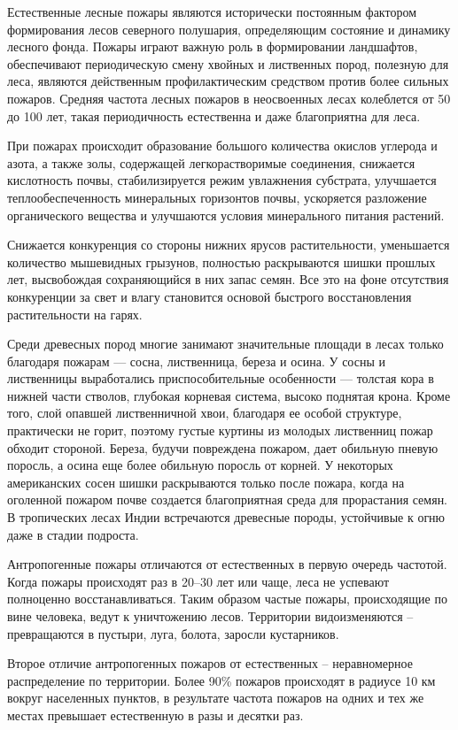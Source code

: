     Естественные лесные пожары являются исторически постоянным фактором формирования лесов северного полушария, определяющим состояние и динамику лесного фонда. Пожары играют важную роль в формировании ландшафтов, обеспечивают периодическую смену хвойных и лиственных пород, полезную для леса, являются действенным профилактическим средством против более сильных пожаров. Средняя частота лесных пожаров в неосвоенных лесах колеблется от 50 до 100 лет, такая периодичность естественна и даже благоприятна для леса.
    
    При пожарах происходит образование большого количества окислов углерода и азота, а также золы, содержащей легкорастворимые соединения, снижается кислотность почвы, стабилизируется режим увлажнения субстрата, улучшается теплообеспеченность минеральных горизонтов почвы, ускоряется разложение органического вещества и улучшаются условия минерального питания растений.
    
    Снижается конкуренция со стороны нижних ярусов растительности, уменьшается количество мышевидных грызунов, полностью раскрываются шишки прошлых лет, высвобождая сохраняющийся в них запас семян. Все это на фоне отсутствия конкуренции за свет и влагу становится основой быстрого восстановления растительности на гарях.
    
    Среди древесных пород многие занимают значительные площади в лесах только благодаря пожарам — сосна, лиственница, береза и осина. У сосны и лиственницы выработались приспособительные особенности — толстая кора в нижней части стволов, глубокая корневая система, высоко поднятая крона. Кроме того, слой опавшей лиственничной хвои, благодаря ее особой структуре, практически не горит, поэтому густые куртины из молодых лиственниц пожар обходит стороной. Береза, будучи повреждена пожаром, дает обильную пневую поросль, а осина еще более обильную поросль от корней. У некоторых американских сосен шишки раскрываются только после пожара, когда на оголенной пожаром почве создается благоприятная среда для прорастания семян. В тропических лесах Индии встречаются древесные породы, устойчивые к огню даже в стадии подроста.

    Антропогенные пожары отличаются от естественных в первую очередь частотой. Когда пожары происходят раз в 20–30 лет или чаще, леса не успевают полноценно восстанавливаться. Таким образом частые пожары, происходящие по вине человека, ведут к уничтожению лесов. Территории видоизменяются – превращаются в пустыри, луга, болота, заросли кустарников. 

    Второе отличие антропогенных пожаров от естественных – неравномерное распределение по территории. Более 90\% пожаров происходят в радиусе 10 км вокруг населенных пунктов, в результате частота пожаров на одних и тех же местах превышает естественную в разы и десятки раз.


